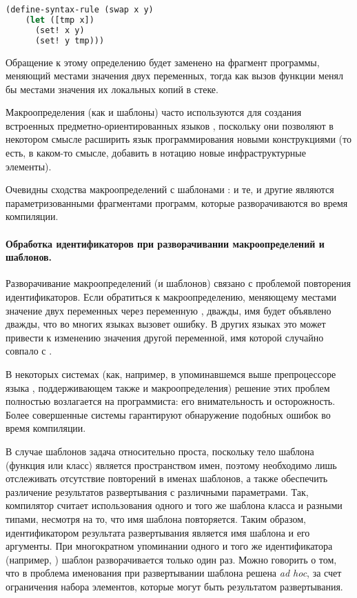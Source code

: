 \begin{lstlisting}[language=Lisp,label=scheme_swap]
 (define-syntax-rule (swap x y)
    (let ([tmp x])
      (set! x y)
      (set! y tmp)))
\end{lstlisting}

Обращение к этому определению будет заменено на фрагмент программы, меняющий местами значения двух переменных, тогда как вызов функции менял бы местами значения их локальных копий в стеке.

Макроопределения (как и шаблоны) часто используются для создания встроенных предметно-ориентированных языков \cite{???}, поскольку они позволяют в некотором смысле расширить язык программирования новыми конструкциями (то есть, в каком-то смысле, добавить в нотацию новые инфраструктурные элементы).

Очевидны сходства макроопределений  с шаблонами : и те, и другие являются параметризованными фрагментами программ, которые разворачиваются во время компиляции. 

\paragraph*{Обработка идентификаторов при разворачивании макроопределений и шаблонов.}
Разворачивание макроопределений (и шаблонов) связано с проблемой повторения идентификаторов. Если обратиться к макроопределению, меняющему местами значение двух переменных через переменную , дважды, имя  будет объявлено дважды, что во многих языках вызовет ошибку. В других языках это может привести к изменению значения другой переменной, имя которой случайно совпало с .

В некоторых системах (как, например, в упоминавшемся выше препроцессоре языка , поддерживающем также и макроопределения) решение этих проблем полностью возлагается на программиста: его внимательность и осторожность. Более совершенные системы гарантируют обнаружение подобных ошибок во время компиляции.

В случае шаблонов  задача относительно проста, поскольку тело шаблона (функция или класс) является пространством имен, поэтому необходимо лишь отслеживать отсутствие повторений в именах шаблонов, а также обеспечить различение результатов развертывания с различными параметрами. Так, компилятор считает использования одного и того же шаблона класса  и  разными типами, несмотря на то, что имя шаблона повторяется. Таким образом, идентификатором результата развертывания является имя шаблона и его аргументы. При многократном упоминании одного и того же идентификатора (например, ) шаблон разворачивается только один раз. Можно говорить о том, что в  проблема именования при развертывании шаблона решена \emph{ad hoc}, за счет ограничения набора элементов, которые могут быть результатом развертывания.


